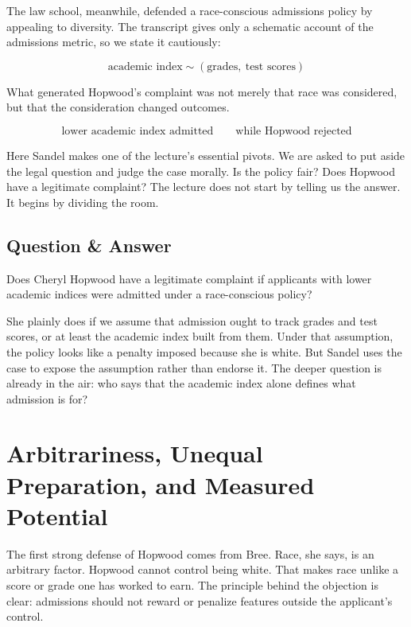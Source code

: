 The law school, meanwhile, defended a race-conscious admissions policy by appealing to diversity. The transcript gives only a schematic account of the admissions metric, so we state it cautiously:

\begin{equation}
\text{academic index} \sim (\text{grades},\ \text{test scores})
\end{equation}

What generated Hopwood's complaint was not merely that race was considered, but that the consideration changed outcomes.

\begin{equation}
\text{lower academic index admitted}
\qquad
\text{while Hopwood rejected}
\end{equation}

Here Sandel makes one of the lecture's essential pivots. We are asked to put aside the legal question and judge the case morally. Is the policy fair? Does Hopwood have a legitimate complaint? The lecture does not start by telling us the answer. It begins by dividing the room.

\subsection{Question \& Answer}

Does Cheryl Hopwood have a legitimate complaint if applicants with lower academic indices were admitted under a race-conscious policy?

She plainly does if we assume that admission ought to track grades and test scores, or at least the academic index built from them. Under that assumption, the policy looks like a penalty imposed because she is white. But Sandel uses the case to expose the assumption rather than endorse it. The deeper question is already in the air: who says that the academic index alone defines what admission is for?

\section{Arbitrariness, Unequal Preparation, and Measured Potential}

The first strong defense of Hopwood comes from Bree. Race, she says, is an arbitrary factor. Hopwood cannot control being white. That makes race unlike a score or grade one has worked to earn. The principle behind the objection is clear: admissions should not reward or penalize features outside the applicant's control.

